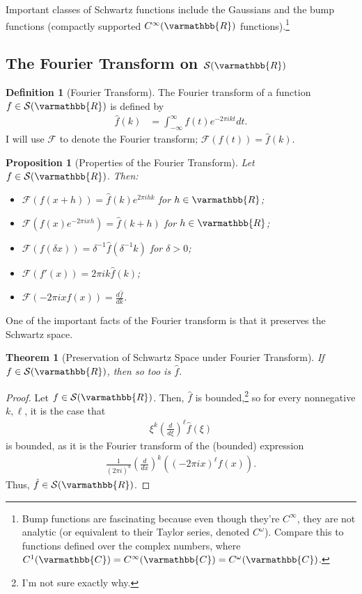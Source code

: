 \documentclass[12pt]{extarticle}
\newcommand{\R}{\varmathbb{R}}
\newcommand{\C}{\varmathbb{C}}
\theoremstyle{plain}
\newtheorem*{theorem}{Theorem}%
\newtheorem*{proposition}{Proposition}%
\theoremstyle{definition}
\newtheorem*{definition}{Definition}
\theoremstyle{remark}
\begin{document}
  Important classes of Schwartz functions include the Gaussians and the bump functions (compactly supported $C^{\infty}(\R)$ functions).\footnote{Bump functions are fascinating because even though they're $C^{\infty}$, they are not analytic (or equivalent to their Taylor series, denoted $C^{\omega}$). Compare this to functions defined over the complex numbers, where $C^{1}(\C) = C^{\infty}(\C) = C^{\omega}(\C)$.}
  \subsection{The Fourier Transform on $\mathcal{S}(\R)$}%
  \begin{definition}[Fourier Transform]
    The Fourier transform of a function $f\in \mathcal{S}(\R)$ is defined by
    \begin{align*}
      \hat{f}(k) &= \int_{-\infty}^{\infty}f(t)e^{-2\pi i k t}dt.
    \end{align*}
    I will use $\mathcal{F}$ to denote the Fourier transform; $\mathcal{F}(f(t)) = \hat{f}(k)$. 
  \end{definition}
  \begin{proposition}[Properties of the Fourier Transform]
    Let $f\in \mathcal{S}(\R)$. Then:
    \begin{itemize}
      \item $\displaystyle\mathcal{F}(f(x+h)) = \hat{f}(k)e^{2\pi i h k}$ for $h\in \R$;
      \item $\displaystyle \mathcal{F}\left(f(x)e^{-2\pi i x h}\right) = \hat{f}(k + h)$ for $h\in \R$;
      \item $\displaystyle \mathcal{F}\left(f(\delta x)\right) = \delta^{-1}\hat{f}(\delta^{-1}k)$ for $\delta > 0$;
      \item $\mathcal{F}(f'(x)) = 2\pi i k \hat{f}(k)$;
      \item $\mathcal{F}(-2\pi i x f(x)) = \frac{d\hat{f}}{dk}$.
    \end{itemize}
  \end{proposition}
  One of the important facts of the Fourier transform is that it preserves the Schwartz space.
  \begin{theorem}[Preservation of Schwartz Space under Fourier Transform]
    If $f\in \mathcal{S}(\R)$, then so too is $\hat{f}$.
  \end{theorem}
  \begin{proof}
    Let $f\in \mathcal{S}(\R)$. Then, $\hat{f}$ is bounded,\footnote{I'm not sure exactly why.} so for every nonnegative $k,\ell$, it is the case that
    \begin{align*}
      \xi^{k}\left(\frac{d}{d\xi}\right)^{\ell}\hat{f}(\xi)
    \end{align*}
    is bounded, as it is the Fourier transform of the (bounded) expression
    \begin{align*}
      \frac{1}{(2\pi i)^k}\left(\frac{d}{dx}\right)^k \left((-2\pi i x)^{\ell}f(x)\right).
    \end{align*}
    Thus, $\hat{f}\in \mathcal{S}(\R)$.
  \end{proof}
\end{document}
